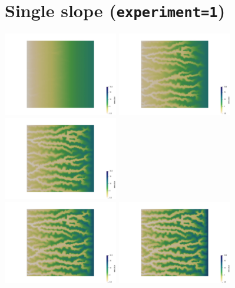 \section*{Single slope ({\tt experiment=1})}

\begin{center}
\includegraphics[width=5cm]{python_codes/fieldstone_140/results/exp1/elevation0000}
\includegraphics[width=5cm]{python_codes/fieldstone_140/results/exp1/elevation0002}
\includegraphics[width=5cm]{python_codes/fieldstone_140/results/exp1/elevation0004}\\
\includegraphics[width=5cm]{python_codes/fieldstone_140/results/exp1/elevation0006}
\includegraphics[width=5cm]{python_codes/fieldstone_140/results/exp1/elevation0008}

\end{center}
